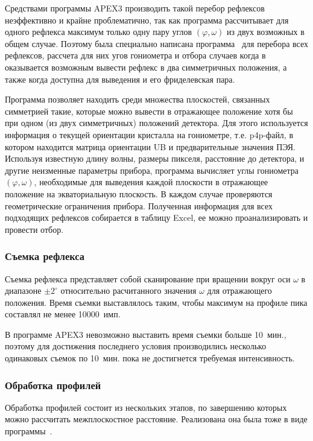 \documentclass[a4paper, 12pt]{article}
\begin{document}
Средствами программы APEX3 производить такой перебор рефлексов неэффективно и крайне проблематично, так как программа рассчитывает для одного рефлекса максимум только одну пару углов $(\varphi, \omega)$ из двух возможных в общем случае.
Поэтому была специально написана программа~\cite{Kudryavtsev:2024:2} для перебора всех рефлексов, рассчета для них угов гониометра и отбора случаев когда в оказывается возможным вывести рефлекс в два симметричных положения, а также когда доступна для выведения и его фриделевская пара.

Программа позволяет находить среди множества плоскостей, связанных симметрией такие, которые можно вывести в отражающее положение хотя бы при одном (из двух симметричных) положений детектора.
Для этого используется информация о текущей ориентации кристалла на гониометре, т.е. p4p-файл, в котором находится матрица ориентации UB и предварительные значения ПЭЯ.
Используя известную длину волны, размеры пикселя, расстояние до детектора, и другие неизменные параметры прибора, программа вычисляет углы гониометра $(\varphi, \omega)$, необходимые для выведения каждой плоскости в отражающее положение на экваториальную плоскость.
В каждом случае проверяются геометрические ограничения прибора.
Полученная информация для всех подходящих рефлексов собирается в таблицу Excel, ее можно проанализировать и провести отбор.
\subsubsection{Съемка рефлекса}
Съемка рефлекса представляет собой сканирование при вращении вокруг оси $\omega$ в диапазоне $\pm 2^\circ$ относительно расчитанного значения $\omega$ для отражающего положения.
Время съемки выставлялось таким, чтобы максимум на профиле пика составлял не менее 10000~имп.

В программе APEX3 невозможно выставить время съемки больше 10~мин., поэтому для достижения последнего условия производились несколько одинаковых съемок по 10~мин. пока не достигнется требуемая интенсивность.
\subsubsection{Обработка профилей}
Обработка профилей состоит из нескольких этапов, по завершению которых можно рассчитать межплоскостное расстояние.
Реализована она была тоже в виде программы~\cite{Kudryavtsev:2024:2}.
\end{document}
